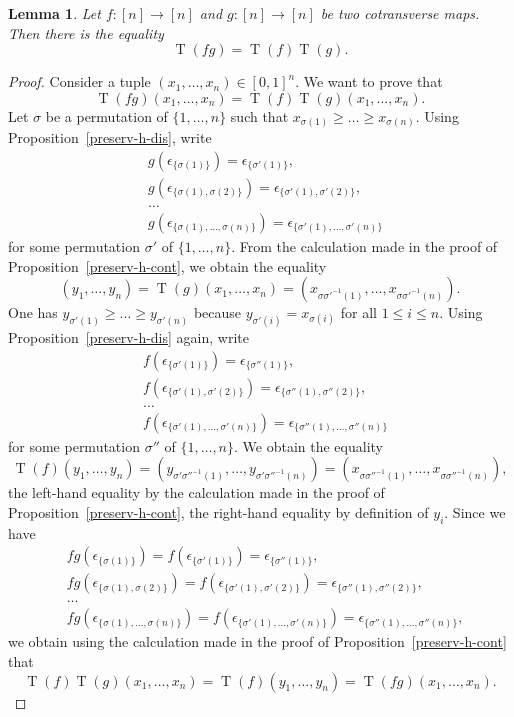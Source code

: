 \documentclass[a4paper,12pt]{amsart}
\newtheorem{lem}[thm]{Lemma}
\newcommand{\bpf}{\begin{proof}}
\newcommand{\epf}{\end{proof}}
\theoremstyle{definition}
\renewcommand{\leq}{\leqslant}
\renewcommand{\geq}{\geqslant}
\DeclareMathOperator{\TT}{T}
\begin{document}
\begin{lem} \label{prefunc}
Let $f:[n]\to [n]$ and $g:[n]\to [n]$ be two cotransverse maps. Then there is the equality \[\TT(fg) = \TT(f) \TT(g).\]
\end{lem}


\bpf
Consider a tuple $(x_1,\dots,x_n) \in [0,1]^n$. We want to prove that \[\TT(fg)(x_1,\dots,x_n) = \TT(f)\TT(g)(x_1,\dots,x_n).\] Let $\sigma$ be a permutation of $\{1,\dots,n\}$ such that $x_{\sigma(1)}\geq\dots \geq x_{\sigma(n)}$. Using Proposition~\ref{preserv-h-dis}, write 
\begin{align*}
	& g(\epsilon_{\{\sigma(1)\}}) = \epsilon_{\{\sigma'(1)\}},\\
	& g(\epsilon_{\{\sigma(1),\sigma(2)\}}) = \epsilon_{\{\sigma'(1),\sigma'(2)\}},\\
	&\dots \\
	& g(\epsilon_{\{\sigma(1),\dots,\sigma(n)\}}) = \epsilon_{\{\sigma'(1),\dots,\sigma'(n)\}}
\end{align*}
for some permutation $\sigma'$ of $\{1,\dots,n\}$. From the calculation made in the proof of Proposition~\ref{preserv-h-cont}, we obtain the equality  \[(y_1,\dots,y_n)=\TT(g)(x_1,\dots,x_n)=(x_{\sigma\sigma'^{-1}(1)},\dots,x_{\sigma\sigma'^{-1}(n)}).\]
One has $y_{\sigma'(1)}\geq \dots\geq y_{\sigma'(n)}$ because $y_{\sigma'(i)} = x_{\sigma(i)}$ for all $1\leq i\leq n$. Using Proposition~\ref{preserv-h-dis} again, write 
\begin{align*}
	& f(\epsilon_{\{\sigma'(1)\}}) = \epsilon_{\{\sigma''(1)\}},\\
	& f(\epsilon_{\{\sigma'(1),\sigma'(2)\}}) = \epsilon_{\{\sigma''(1),\sigma''(2)\}},\\
	&\dots \\
	& f(\epsilon_{\{\sigma'(1),\dots,\sigma'(n)\}}) = \epsilon_{\{\sigma''(1),\dots,\sigma''(n)\}}
\end{align*}
for some permutation $\sigma''$ of $\{1,\dots,n\}$. We obtain the equality  \[\TT(f)(y_1,\dots,y_n)=(y_{\sigma'\sigma''^{-1}(1)},\dots,y_{\sigma'\sigma''^{-1}(n)}) = (x_{\sigma\sigma''^{-1}(1)},\dots,x_{\sigma\sigma''^{-1}(n)}),\]
the left-hand equality by the calculation made in the proof of Proposition~\ref{preserv-h-cont}, the right-hand equality by definition of $y_i$. Since we have 
\begin{align*}
	& fg(\epsilon_{\{\sigma(1)\}}) = f(\epsilon_{\{\sigma'(1)\}}) = \epsilon_{\{\sigma''(1)\}},\\
	& fg(\epsilon_{\{\sigma(1),\sigma(2)\}}) = f(\epsilon_{\{\sigma'(1),\sigma'(2)\}})= \epsilon_{\{\sigma''(1),\sigma''(2)\}},\\
	&\dots \\
	& fg(\epsilon_{\{\sigma(1),\dots,\sigma(n)\}}) = f(\epsilon_{\{\sigma'(1),\dots,\sigma'(n)\}})= \epsilon_{\{\sigma''(1),\dots,\sigma''(n)\}},
\end{align*}
we obtain using the calculation made in the proof of Proposition~\ref{preserv-h-cont} that \[\TT(f)\TT(g)(x_1,\dots,x_n)= \TT(f)(y_1,\dots,y_n) = \TT(fg)(x_1,\dots,x_n).\]
\epf
\end{document}
